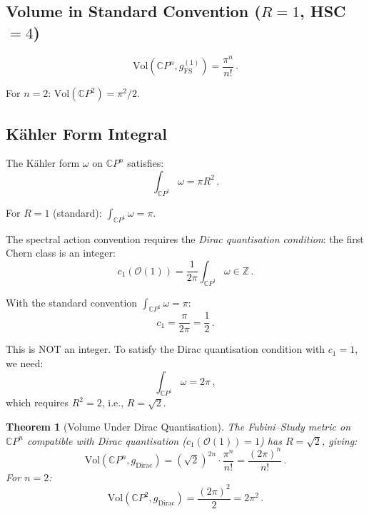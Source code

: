 \documentclass[11pt,a4paper]{article}
\newtheorem{theorem}{Theorem}
\newcommand{\CP}{\mathbb{C}P}
\begin{document}
\subsection{Volume in Standard Convention ($R = 1$, HSC $= 4$)}

\begin{equation}
\mathrm{Vol}(\CP^n, g_{\mathrm{FS}}^{(1)}) = \frac{\pi^n}{n!}\,.
\end{equation}

For $n = 2$: $\mathrm{Vol}(\CP^2) = \pi^2/2$.

\subsection{K\"ahler Form Integral}

The K\"ahler form $\omega$ on $\CP^n$ satisfies:
\begin{equation}
\int_{\CP^1} \omega = \pi R^2\,.
\end{equation}

For $R = 1$ (standard): $\int_{\CP^1} \omega = \pi$.

The spectral action convention requires the \emph{Dirac quantisation condition}: the first Chern class is an integer:
\begin{equation}
c_1(\mathcal{O}(1)) = \frac{1}{2\pi}\int_{\CP^1}\omega \in \mathbb{Z}\,.
\end{equation}

With the standard convention $\int_{\CP^1}\omega = \pi$:
\begin{equation}
c_1 = \frac{\pi}{2\pi} = \frac{1}{2}\,.
\end{equation}

This is NOT an integer. To satisfy the Dirac quantisation condition with $c_1 = 1$, we need:
\begin{equation}
\int_{\CP^1}\omega = 2\pi\,,
\end{equation}
which requires $R^2 = 2$, i.e., $R = \sqrt{2}$.

\begin{theorem}[Volume Under Dirac Quantisation]
The Fubini--Study metric on $\CP^n$ compatible with Dirac quantisation ($c_1(\mathcal{O}(1)) = 1$) has $R = \sqrt{2}$, giving:
\begin{equation}
\mathrm{Vol}(\CP^n, g_{\mathrm{Dirac}}) = (\sqrt{2})^{2n} \cdot \frac{\pi^n}{n!} = \frac{(2\pi)^n}{n!}\,.
\end{equation}
For $n = 2$:
\begin{equation}
\mathrm{Vol}(\CP^2, g_{\mathrm{Dirac}}) = \frac{(2\pi)^2}{2} = 2\pi^2\,.
\end{equation}
\end{theorem}
\end{document}
